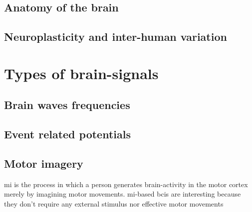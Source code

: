 \lipsum[1-3]



\subsection{Anatomy of the brain}
\label{subsec:biomedical_signals_origin_anatomy_brain}

\lipsum[1-4]


\subsection{Neuroplasticity and inter-human variation}
\label{subsec:biomedical_signals_origin_general_brain_layout}

\lipsum[1-3]


\section{Types of brain-signals}
\label{sec:biomedical_signals_type_of_signals}

\lipsum[1-2]


\subsection{Brain waves frequencies}
\label{subsec:biomedical_signals_type_of_signals_brain_wave}

\lipsum[1-2]


\subsection{Event related potentials}
\label{subsec:biomedical_signals_type_of_signals_erp}

\lipsum[1-2]


\subsection{Motor imagery}
\label{subsec:biomedical_signals_type_of_signals_motor_imagery}

\Gls{mi} is the process in which a person generates brain-activity in the motor cortex merely by imagining motor movements.
\Gls{mi}-based \glspl{bci} are interesting because they don't require any external stimulus nor effective motor movements

